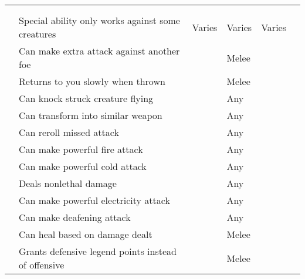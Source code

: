         \onecolumn
        \begin{longtabuwrapper}
            \begin{longtabu}{l X l l l l}
                \\
                 &  &  &  &  &  \\
                 & Special ability only works against some creatures & Varies & Varies & Varies &  \\
                 & Can make extra attack against another foe &  & Melee &  \\
                 & Returns to you slowly when thrown &  & Melee &  \\
                 & Can knock struck creature flying &  & Any &  \\
                 & Can transform into similar weapon &  & Any &  \\
                 & Can reroll missed attack &  & Any &  \\
                 & Can make powerful fire attack &  & Any &  \\
                 & Can make powerful cold attack &  & Any &  \\
                 & Deals nonlethal damage &  & Any &  \\
                 & Can make powerful electricity attack &  & Any &  \\
                 & Can make deafening attack &  & Any &  \\
                 & Can heal based on damage dealt &  & Melee &  \\
                 & Grants defensive legend points instead of offensive &  & Melee &  \\

\end{longtabu}
\end{longtabuwrapper}

